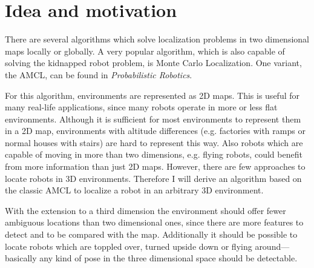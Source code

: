 \documentclass[Thesis.tex]{subfiles}
\begin{document}
\section{Idea and motivation}

There are several algorithms which solve localization problems in two dimensional maps locally or globally. A very popular algorithm, which is also capable of solving the kidnapped robot problem, is Monte Carlo Localization\cite{DellaertFoxBurgardThrun:1999}. One variant, the \gls{AMCL}, can be found in \emph{Probabilistic Robotics}\cite{ThrunBurgardFox:2005}.

For this algorithm, environments are represented as 2D maps. This is useful for many real-life applications, since many robots operate in more or less flat environments. Although it is sufficient for most environments to represent them in a 2D map, environments with altitude differences (e.g. factories with ramps or normal houses with stairs) are hard to represent this way. Also robots which are capable of moving in more than two dimensions, e.g. flying robots, could benefit from more information than just 2D maps.
However, there are few approaches to locate robots in 3D environments. Therefore I will derive an algorithm based on the classic \gls{AMCL} to localize a robot in an arbitrary 3D environment.

With the extension to a third dimension the environment should offer fewer ambiguous locations than two dimensional ones, since there are more features to detect and to be compared with the map. %
Additionally it should be possible to locate robots which are toppled over, turned upside down or flying around---basically any kind of pose in the three dimensional space should be detectable.
\end{document}
